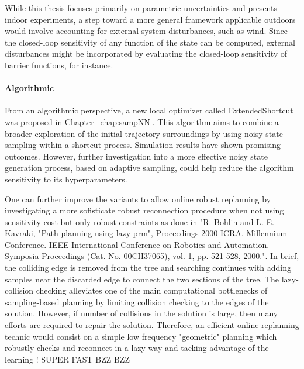 While this thesis focuses primarily on parametric uncertainties and presents indoor experiments, a step toward a more general framework applicable outdoors would involve accounting for external system disturbances, such as wind.
Since the closed-loop sensitivity of any function of the state can be computed, external disturbances might be incorporated by evaluating the closed-loop sensitivity of barrier functions, for instance.

\paragraph{Algorithmic}

From an algorithmic perspective, a new local optimizer called ExtendedShortcut was proposed in Chapter~\ref{chap:sampNN}. 
This algorithm aims to combine a broader exploration of the initial trajectory surroundings by using noisy state sampling within a shortcut process. 
Simulation results have shown promising outcomes. 
However, further investigation into a more effective noisy state generation process, based on adaptive sampling, could help reduce the algorithm sensitivity to its hyperparameters.


One can further improve the  variants to allow online robust replanning by investigating a more sofisticate robust reconnection procedure when not using sensitivity cost but only robust constraints as done in "R. Bohlin and L. E. Kavraki, "Path planning using lazy prm", Proceedings 2000 ICRA. Millennium Conference. IEEE International Conference on Robotics and Automation. Symposia Proceedings (Cat. No. 00CH37065), vol. 1, pp. 521-528, 2000.".
In brief, the colliding edge is removed from the tree and searching continues with adding samples near the discarded edge to connect the two sections of the tree. The lazy-collision checking alleviates one of the main computational bottlenecks of sampling-based planning by limiting collision checking to the edges of the solution. 
However, if number of collisions in the solution is large, then many efforts are required to repair the solution. 
Therefore, an efficient online replanning technic would consist on a simple low frequency "geometric" planning which robustly checks and reconnect in a lazy way and tacking advantage of the learning ! SUPER FAST BZZ BZZ 

